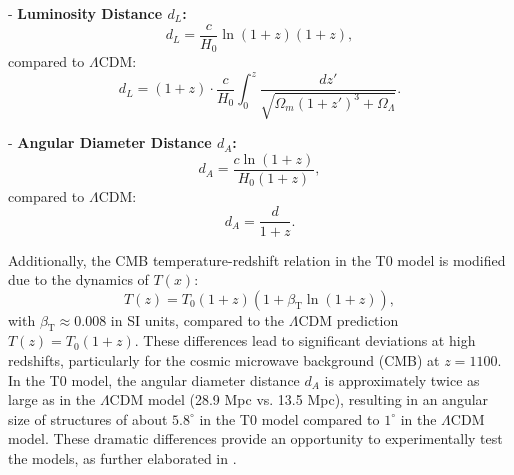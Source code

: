 \documentclass[12pt,a4paper]{article}
\newcommand{\Tfield}{T(x)}
\newcommand{\betaT}{\beta_{\text{T}}}
\begin{document}
	- \textbf{Luminosity Distance \( d_L \):}
	\[
	d_L = \frac{c}{H_0} \ln(1 + z) (1 + z),
	\]
	compared to \(\Lambda\)CDM:
	\[
	d_L = (1 + z) \cdot \frac{c}{H_0} \int_0^z \frac{dz'}{\sqrt{\Omega_m (1 + z')^3 + \Omega_\Lambda}}.
	\]
	
	- \textbf{Angular Diameter Distance \( d_A \):}
	\[
	d_A = \frac{c \ln(1 + z)}{H_0 (1 + z)},
	\]
	compared to \(\Lambda\)CDM:
	\[
	d_A = \frac{d}{1 + z}.
	\]
	
	Additionally, the CMB temperature-redshift relation in the T0 model is modified due to the dynamics of \( \Tfield \):
	\begin{equation}
		T(z) = T_0 (1 + z) (1 + \betaT \ln(1 + z)),
	\end{equation}
	with \( \betaT \approx 0.008 \) in SI units, compared to the \(\Lambda\)CDM prediction \( T(z) = T_0 (1 + z) \). These differences lead to significant deviations at high redshifts, particularly for the cosmic microwave background (CMB) at \( z = 1100 \). In the T0 model, the angular diameter distance \( d_A \) is approximately twice as large as in the \(\Lambda\)CDM model (28.9 Mpc vs. 13.5 Mpc), resulting in an angular size of structures of about \( 5.8^\circ \) in the T0 model compared to \( 1^\circ \) in the \(\Lambda\)CDM model. These dramatic differences provide an opportunity to experimentally test the models, as further elaborated in \cite{pascher_messdifferenzen_2025}.
	
\end{document}
